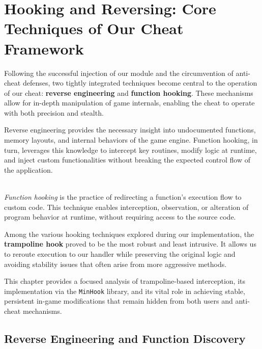 \chapter{Hooking and Reversing: Core Techniques of Our Cheat Framework}

Following the successful injection of our module and the circumvention of anti-cheat defenses, two tightly integrated techniques become central to the operation of our cheat: \textbf{reverse engineering} and \textbf{function hooking}. These mechanisms allow for in-depth manipulation of game internals, enabling the cheat to operate with both precision and stealth.

Reverse engineering provides the necessary insight into undocumented functions, memory layouts, and internal behaviors of the game engine. Function hooking, in turn, leverages this knowledge to intercept key routines, modify logic at runtime, and inject custom functionalities without breaking the expected control flow of the application.

\begin{tcolorbox}[colback=gray!10, colframe=gray!50, boxrule=0pt, sharp corners, width=\linewidth, left=1mm, right=1mm, top=0.5mm, bottom=0.5mm]
 \\
\textit{Function hooking} is the practice of redirecting a function's execution flow to custom code. This technique enables interception, observation, or alteration of program behavior at runtime, without requiring access to the source code.
\end{tcolorbox}

Among the various hooking techniques explored during our implementation, the \textbf{trampoline hook} proved to be the most robust and least intrusive. It allows us to reroute execution to our handler while preserving the original logic and avoiding stability issues that often arise from more aggressive methods.

This chapter provides a focused analysis of trampoline-based interception, its implementation via the \texttt{MinHook} library, and its vital role in achieving stable, persistent in-game modifications that remain hidden from both users and anti-cheat mechanisms.

\section{Reverse Engineering and Function Discovery}

